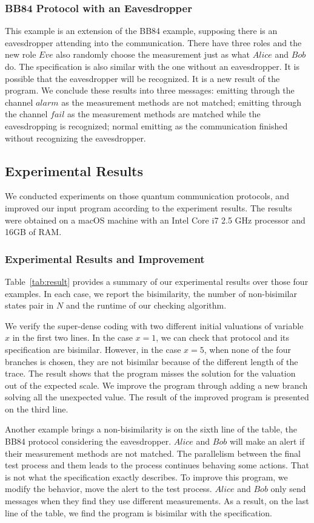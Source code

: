 \documentclass[runningheads]{llncs}
\begin{document}
\subsubsection{BB84 Protocol with an Eavesdropper} This example is an extension of the BB84 example, supposing there is an eavesdropper attending into the communication. There have three roles and the new role $Eve$ also randomly choose the measurement just as what $Alice$ and $Bob$ do. The specification is also similar with the one without an eavesdropper. It is possible that the eavesdropper will be recognized. It is a new result of the program. We conclude these results into three messages: emitting through the channel $alarm$ as the measurement methods are not matched; emitting through the channel $fail$ as the measurement methods are matched while the eavesdropping is recognized; normal emitting as the communication finished without recognizing the eavesdropper.
\subsection{Experimental Results}
We conducted experiments on those quantum communication protocols, and improved our input program according to the experiment results. The results were obtained on a macOS machine with an Intel Core i7 2.5 GHz processor and 16GB of RAM.
\subsubsection{Experimental Results and Improvement}Table~\ref{tab:result} provides a summary of our experimental results over those four examples. In each case, we report the bisimilarity, the number of non-bisimilar states pair in $N$ and the runtime of our checking algorithm.

We verify the super-dense coding with two different initial valuations of variable $x$ in the first two lines. In the case $x=1$, we can check that protocol and its specification are bisimilar. However, in the case $x=5$, when none of the four branches is chosen, they are not bisimilar because of the different length of the trace. The result shows that the program misses the solution for the valuation out of the expected scale. We improve the program through adding a new branch solving all the unexpected value. The result of the improved program is presented on the third line. 

Another example brings a non-bisimilarity is on the sixth line of the table, the BB84 protocol considering the eavesdropper. $Alice$ and $Bob$ will make an alert if their measurement methods are not matched. The parallelism between the final test process and them leads to the process continues behaving some actions. That is not what the specification exactly describes. To improve this program, we modify the behavior, move the alert to the test process. $Alice$ and $Bob$ only send messages when they find they use different measurements. As a result, on the last line of the table, we find the program is bisimilar with the specification.
\end{document}

